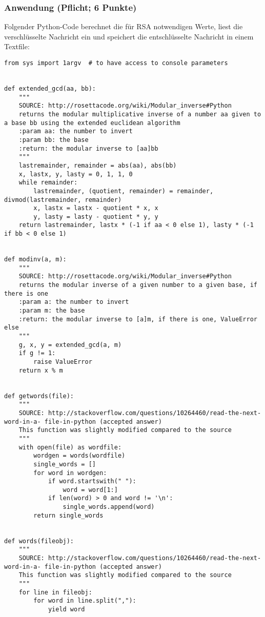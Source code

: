 \documentclass{article}
\begin{document}
\subsubsection{Anwendung (Pflicht; 6 Punkte)}
Folgender Python-Code berechnet die für RSA notwendigen Werte, liest die verschlüsselte Nachricht ein und speichert die entschlüsselte Nachricht in einem Textfile:
\begin{lstlisting}[caption=\string$ python rsa.py msg.txt]
from sys import 1argv  # to have access to console parameters


def extended_gcd(aa, bb):
    """
    SOURCE: http://rosettacode.org/wiki/Modular_inverse#Python
    returns the modular multiplicative inverse of a number aa given to a base bb using the extended euclidean algorithm
    :param aa: the number to invert
    :param bb: the base
    :return: the modular inverse to [aa]bb
    """
    lastremainder, remainder = abs(aa), abs(bb)
    x, lastx, y, lasty = 0, 1, 1, 0
    while remainder:
        lastremainder, (quotient, remainder) = remainder, divmod(lastremainder, remainder)
        x, lastx = lastx - quotient * x, x
        y, lasty = lasty - quotient * y, y
    return lastremainder, lastx * (-1 if aa < 0 else 1), lasty * (-1 if bb < 0 else 1)


def modinv(a, m):
    """
    SOURCE: http://rosettacode.org/wiki/Modular_inverse#Python
    returns the modular inverse of a given number to a given base, if there is one
    :param a: the number to invert
    :param m: the base
    :return: the modular inverse to [a]m, if there is one, ValueError else
    """
    g, x, y = extended_gcd(a, m)
    if g != 1:
        raise ValueError
    return x % m


def getwords(file):
    """
    SOURCE: http://stackoverflow.com/questions/10264460/read-the-next-word-in-a- file-in-python (accepted answer)
    This function was slightly modified compared to the source
    """
    with open(file) as wordfile:
        wordgen = words(wordfile)
        single_words = []
        for word in wordgen:
            if word.startswith(" "):
                word = word[1:]
            if len(word) > 0 and word != '\n':
                single_words.append(word)
        return single_words


def words(fileobj):
    """
    SOURCE: http://stackoverflow.com/questions/10264460/read-the-next-word-in-a- file-in-python (accepted answer)
    This function was slightly modified compared to the source
    """
    for line in fileobj:
        for word in line.split(","):
            yield word



\end{lstlisting}
\end{document}
